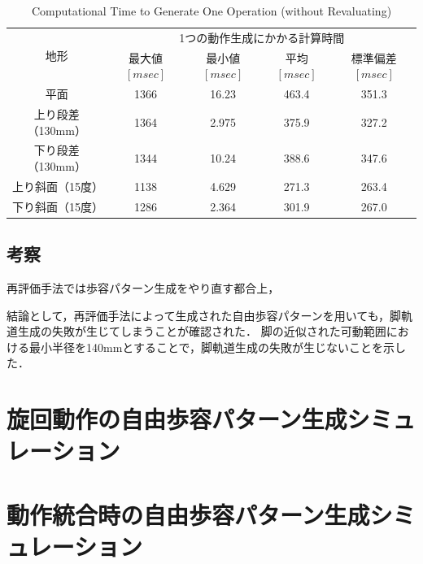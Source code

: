 \begin{table}[htbp]
  \caption{Computational Time to Generate One Operation (without Revaluating)}
  \label{tab:ch5_calc_time_140mm}  %
  \centering
  \begin{tabular}{|c||c|c|c|c|} \hline  %
    \multirow{2}{*}{地形} & \multicolumn{4}{c|}{1つの動作生成にかかる計算時間} \\ \cline{2-5}  %
     & 最大値 $[msec]$ & 最小値 $[msec]$ & 平均 $[msec]$ & 標準偏差 $[msec]$ \\ \hline \hline  %
    平面 & 1366 & 16.23 & 463.4 & 351.3 \\ \hline %
    上り段差（130mm）& 1364 & 2.975 & 375.9 & 327.2 \\ \hline %
    下り段差（130mm）& 1344 & 10.24 & 388.6 & 347.6 \\ \hline %
    上り斜面（15度） & 1138 & 4.629 & 271.3 & 263.4 \\ \hline %
    下り斜面（15度） & 1286 & 2.364 & 301.9 & 267.0 \\ \hline %
  \end{tabular}
\end{table}

\subsection{考察}
再評価手法では歩容パターン生成をやり直す都合上，

結論として，再評価手法によって生成された自由歩容パターンを用いても，脚軌道生成の失敗が生じてしまうことが確認された．
脚の近似された可動範囲における最小半径を140mmとすることで，脚軌道生成の失敗が生じないことを示した．

\section{旋回動作の自由歩容パターン生成シミュレーション}

\section{動作統合時の自由歩容パターン生成シミュレーション}
